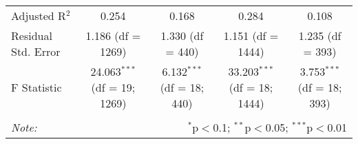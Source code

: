 \begin{table}[!htbp]
\begin{tabular}{@{\extracolsep{5pt}}lcccc}
Adjusted R$^{2}$ & 0.254 & 0.168 & 0.284 & 0.108 \\ 
Residual Std. Error & 1.186 (df = 1269) & 1.330 (df = 440) & 1.151 (df = 1444) & 1.235 (df = 393) \\ 
F Statistic & 24.063$^{***}$ (df = 19; 1269) & 6.132$^{***}$ (df = 18; 440) & 33.203$^{***}$ (df = 18; 1444) & 3.753$^{***}$ (df = 18; 393) \\ 
\hline 
\hline \\[-1.8ex] 
\textit{Note:}  & \multicolumn{4}{r}{$^{*}$p$<$0.1; $^{**}$p$<$0.05; $^{***}$p$<$0.01} \\ 
\end{tabular} 
\end{table} 
